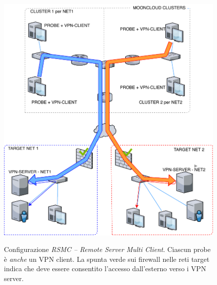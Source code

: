 \begin{figure}
  \includegraphics[scale=0.6]{img/rsmc}
  \label{fig:rsmc}
  \caption[Configurazione \textit{RSMC -- Remote Server Multi Client}]{Configurazione
  \textit{RSMC -- Remote Server Multi Client}. Ciascun probe è \textit{anche} un VPN client.
  La spunta verde sui firewall nelle reti target indica che deve essere consentito l'accesso
  dall'esterno verso i VPN server.}
\end{figure}

